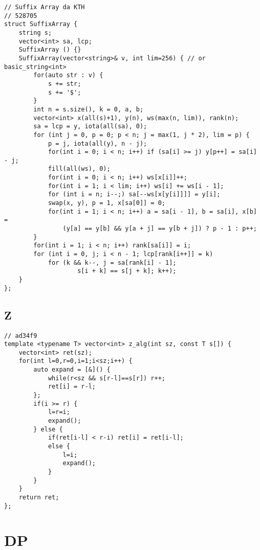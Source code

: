 \documentclass{article}
\begin{document}
\begin{verbatim}
// Suffix Array da KTH
// 528705
struct SuffixArray {
    string s;
    vector<int> sa, lcp;
    SuffixArray () {}
    SuffixArray(vector<string>& v, int lim=256) { // or basic_string<int>
        for(auto str : v) {
            s += str;
            s += '$';
        }
        int n = s.size(), k = 0, a, b;
        vector<int> x(all(s)+1), y(n), ws(max(n, lim)), rank(n);
        sa = lcp = y, iota(all(sa), 0);
        for (int j = 0, p = 0; p < n; j = max(1, j * 2), lim = p) {
            p = j, iota(all(y), n - j);
            for(int i = 0; i < n; i++) if (sa[i] >= j) y[p++] = sa[i] - j;
            fill(all(ws), 0);
            for(int i = 0; i < n; i++) ws[x[i]]++;
            for(int i = 1; i < lim; i++) ws[i] += ws[i - 1];
            for (int i = n; i--;) sa[--ws[x[y[i]]]] = y[i];
            swap(x, y), p = 1, x[sa[0]] = 0;
            for(int i = 1; i < n; i++) a = sa[i - 1], b = sa[i], x[b] =
                (y[a] == y[b] && y[a + j] == y[b + j]) ? p - 1 : p++;
        }
        for(int i = 1; i < n; i++) rank[sa[i]] = i;
        for (int i = 0, j; i < n - 1; lcp[rank[i++]] = k)
            for (k && k--, j = sa[rank[i] - 1];
                    s[i + k] == s[j + k]; k++);
    }
};\end{verbatim}
\subsection{Z}
\begin{verbatim}
// ad34f9
template <typename T> vector<int> z_alg(int sz, const T s[]) {
	vector<int> ret(sz);
	for(int l=0,r=0,i=1;i<sz;i++) {
		auto expand = [&]() {
			while(r<sz && s[r-l]==s[r]) r++;
			ret[i] = r-l;
		};
		if(i >= r) {
			l=r=i;
			expand();
		} else {
			if(ret[i-l] < r-i) ret[i] = ret[i-l];
			else {
				l=i;
				expand();
			}
		}
	}
	return ret;
};
\end{verbatim}
\section{DP}
\end{document}
